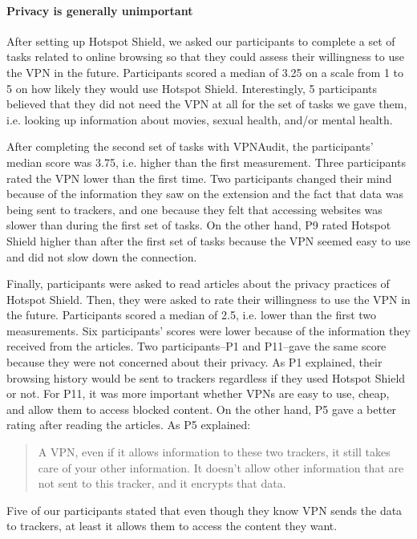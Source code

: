 \paragraph{Privacy is generally unimportant}

After setting up Hotspot Shield, we asked our participants to complete a set of tasks
related to online browsing so that they could assess their willingness
to use the VPN in the future. Participants scored a median of 3.25 on a scale
from 1 to 5 on how likely they would use Hotspot Shield. Interestingly, 5 participants believed that they did not need the VPN at all for the set of tasks we gave them, i.e. looking up information about movies, sexual health, and/or mental health.

After completing the second set of tasks with VPNAudit, the participants' median score was 3.75, i.e. higher than the first measurement. Three participants rated the VPN lower than the
first time. Two participants changed their mind because of the information they saw on the extension and the fact that data was being sent to trackers, and one because
they felt that accessing websites was slower than during the first set of
tasks.  On the other hand, P9 rated Hotspot Shield higher than after the first set of tasks because the VPN seemed easy to use and did not slow down the connection.

Finally, participants were asked to read articles
about the privacy practices of Hotspot Shield. Then, they were asked to rate
their willingness to use the VPN in the future. Participants scored a median
of 2.5, i.e. lower than the first two measurements. Six participants' scores were
lower because of the information they received from the articles. Two participants--P1 and P11--gave the same score because they were not concerned about their privacy. As P1 explained, their browsing history would be sent to trackers regardless if they used Hotspot Shield or not.
For P11, it was more important whether VPNs are easy to use, cheap, and allow
them to access blocked content. On the other hand, P5 gave a better rating after reading the articles. As P5 explained:

\begin{quote}A VPN, even if it allows information to these two trackers, it
still takes care of your other information. It doesn't allow other information
that are not sent to this tracker, and it encrypts that data.\end{quote} Five
of our participants stated that even though they know VPN sends the data to
trackers, at least it allows them to access the content they want.


